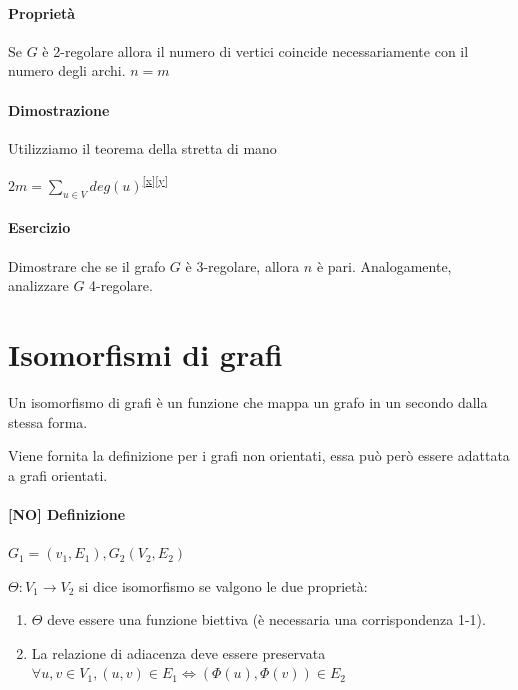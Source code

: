 {{\paragraph{Proprietà}

{Se $G$ è 2-regolare allora il numero di vertici coincide necessariamente con il numero degli archi. $n=m$}

\paragraph{Dimostrazione}

{Utilizziamo il teorema della stretta di mano}

$2m=\sum_{u\in V}{deg(u)}$\textsuperscript{\protect\hyperlink{cmnt24}{{[}x{]}}\protect\hyperlink{cmnt25}{{[}y{]}}}

\paragraph{Esercizio}

{Dimostrare che se il grafo $G$ è 3-regolare, allora $n$ è pari. Analogamente, analizzare $G$ 4-regolare. }

\section{Isomorfismi di grafi}

{Un isomorfismo di grafi è un funzione che mappa un grafo in un secondo dalla stessa forma.}

{Viene fornita la definizione per i grafi non orientati, essa può però essere adattata a grafi orientati.}

\paragraph{{[}NO{]} Definizione}

$G_1=(v_1,E_1),G_2(V_2,E_2)$

{$\Theta:V_1\rightarrow V_2$ si dice isomorfismo se valgono le due proprietà:}

\begin{enumerate}
\tightlist
\item
  {$\Theta$ deve essere una funzione biettiva (è necessaria una corrispondenza 1-1).}
\item
  {La relazione di adiacenza deve essere preservata\\
  $\forall u,v \in V_1, (u,v) \in E_1 \iff (\Phi(u),\Phi(v)) \in E_2$}
\end{enumerate}

}}
